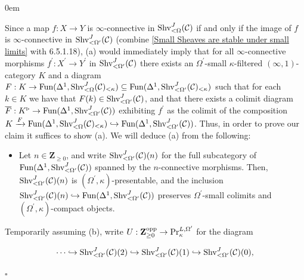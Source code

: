 \documentclass[10pt]{article}
\newcommand{\C}{\mathcal C}
\newcommand{\ZZ}{\mathbb{Z}}
\def\ZZ{{\mathbf Z}}
\renewcommand{\qed}{\hfill$\square$}
\renewenvironment{proof}{\begin{addmargin}[1em]{0em}\begin{newproof}}{\end{newproof}\end{addmargin}\qed}
\theoremstyle{witharg}
\theoremstyle{witharg}
\theoremstyle{witharg2}
\begin{document}
\begin{proof}
     
     \noindent Since a map $f:X\rightarrow Y$ is $\infty$-connective in $\textnormal{Shv}^J_{<\Omega}(\C)$ if and only if the image of $f$ is $\infty$-connective in $\textnormal{Shv}^J_{<\Omega^\prime}(\C)$ (combine \ref{Small Sheaves are stable under small limits} with  6.5.1.18), (a) would immediately imply that for all $\infty$-connective morphisms $f^\prime:X^\prime\rightarrow Y^\prime$ in $\textnormal{Shv}^J_{<\Omega^\prime}(\C)$ there exists an $\Omega^{\prime}$-small $\kappa$-filtered $(\infty,1)$-category $K$ and a diagram $F:K\rightarrow \textnormal{Fun}(\Delta^1,\textnormal{Shv}^J_{<\Omega}(\C)_{<\kappa})\subseteq \textnormal{Fun}(\Delta^1,\textnormal{Shv}^J_{<\Omega^\prime}(\C)_{<\kappa})$ such that for each $k\in K$ we have that $F(k)\in \textnormal{Shv}^J_{<\Omega^\prime}(\C)$, and that there exists a colimit diagram $\overline{F}:K^\triangleright\rightarrow \textnormal{Fun}(\Delta^1,\textnormal{Shv}^J_{<\Omega^\prime}(\C))$ exhibiting $f^\prime$ as the colimit of the composition $K\xrightarrow{F}\textnormal{Fun}(\Delta^1,\textnormal{Shv}^J_{<\Omega}(\C)_{<\kappa})\hookrightarrow \textnormal{Fun}(\Delta^1,\textnormal{Shv}^J_{<\Omega^\prime}(\C))$. Thus, in order to prove our claim it suffices to show (a). We will deduce (a) from the following:

     \begin{itemize}
     
         \item [(b)] Let $n\in \ZZ_{\geq 0}$, and write $\textnormal{Shv}^J_{<\Omega^\prime}(\C)(n)$ for the full subcategory of $\textnormal{Fun}(\Delta^1,\textnormal{Shv}^J_{<\Omega^\prime}(\C))$ spanned by the $n$-connective morphisms. Then, $\textnormal{Shv}^J_{<\Omega^\prime}(\C)(n)$ is $(\Omega^\prime,\kappa)$-presentable, and the inclusion $\textnormal{Shv}^J_{<\Omega^\prime}(\C)(n)\hookrightarrow \textnormal{Fun}(\Delta^1,\textnormal{Shv}^J_{<\Omega^\prime}(\C))$ preserves $\Omega^\prime$-small colimits and $(\Omega^\prime,\kappa)$-compact objects. 
         
     \end{itemize}

     \noindent Temporarily assuming (b), write $U:\ZZ_{\geq 0}^{\textnormal{opp}}\rightarrow \textnormal{Pr}^{L,\Omega^\prime}_\kappa$ for the diagram 
     
     $$\cdots \hookrightarrow \textnormal{Shv}^J_{<\Omega^\prime}(\C)(2)\hookrightarrow\textnormal{Shv}^J_{<\Omega^\prime}(\C)(1)\hookrightarrow \textnormal{Shv}^J_{<\Omega^\prime}(\C)(0),$$
     

\end{proof}
\end{document}
